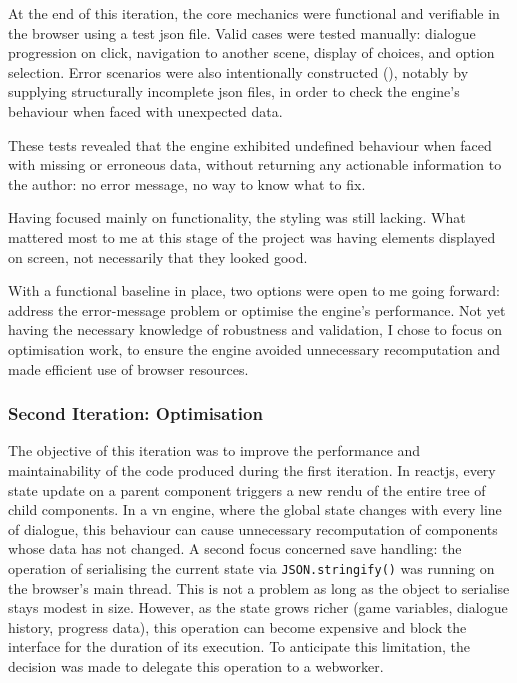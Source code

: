 \clearpage



At the end of this iteration, the core mechanics were functional and verifiable in the browser using a test \gls{json} file. Valid cases were tested manually: dialogue progression on click, navigation to another scene, display of choices, and option selection. Error scenarios were also intentionally constructed (), notably by supplying structurally incomplete \gls{json} files, in order to check the engine's behaviour when faced with unexpected data.

These tests revealed that the engine exhibited undefined behaviour when faced with missing or erroneous data, without returning any actionable information to the author: no error message, no way to know what to fix.

Having focused mainly on functionality, the styling was still lacking. What mattered most to me at this stage of the project was having elements displayed on screen, not necessarily that they looked good.



With a functional baseline in place, two options were open to me going forward: address the error-message problem or optimise the engine's performance. Not yet having the necessary knowledge of robustness and validation, I chose to focus on optimisation work, to ensure the engine avoided unnecessary recomputation and made efficient use of browser resources.

\clearpage


\subsubsection{Second Iteration: Optimisation}


The objective of this iteration was to improve the performance and maintainability of the code produced during the first iteration. In \gls{reactjs}, every state update on a parent component triggers a new \gls{rendu} of the entire tree of child components. In a \gls{vn} engine, where the global state changes with every line of dialogue, this behaviour can cause unnecessary recomputation of components whose data has not changed. A second focus concerned save handling: the operation of serialising the current state via \texttt{JSON.stringify()} was running on the browser's main thread. This is not a problem as long as the object to serialise stays modest in size. However, as the state grows richer (game variables, dialogue history, progress data), this operation can become expensive and block the interface for the duration of its execution. To anticipate this limitation, the decision was made to delegate this operation to a \gls{webworker}.


